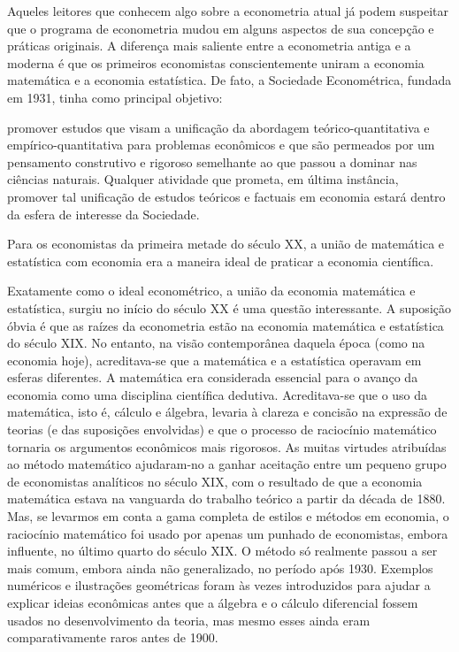 \documentclass[12pt]{article}
\begin{document}
Aqueles leitores que conhecem algo sobre a econometria atual já podem suspeitar que o programa de econometria mudou em alguns aspectos de sua concepção e práticas originais. A diferença mais saliente entre a econometria antiga e a moderna é que os primeiros economistas conscientemente uniram a economia matemática e a economia estatística. De fato, a Sociedade Econométrica, fundada em 1931, tinha como principal objetivo:

promover estudos que visam a unificação da abordagem teórico-quantitativa e empírico-quantitativa para problemas econômicos e que são permeados por um pensamento construtivo e rigoroso semelhante ao que passou a dominar nas ciências naturais. Qualquer atividade que prometa, em última instância, promover tal unificação de estudos teóricos e factuais em economia estará dentro da esfera de interesse da Sociedade.

Para os economistas da primeira metade do século XX, a união de matemática e estatística com economia era a maneira ideal de praticar a economia científica.

Exatamente como o ideal econométrico, a união da economia matemática e estatística, surgiu no início do século XX é uma questão interessante. A suposição óbvia é que as raízes da econometria estão na economia matemática e estatística do século XIX. No entanto, na visão contemporânea daquela época (como na economia hoje), acreditava-se que a matemática e a estatística operavam em esferas diferentes. A matemática era considerada essencial para o avanço da economia como uma disciplina científica dedutiva. Acreditava-se que o uso da matemática, isto é, cálculo e álgebra, levaria à clareza e concisão na expressão de teorias (e das suposições envolvidas) e que o processo de raciocínio matemático tornaria os argumentos econômicos mais rigorosos. As muitas virtudes atribuídas ao método matemático ajudaram-no a ganhar aceitação entre um pequeno grupo de economistas analíticos no século XIX, com o resultado de que a economia matemática estava na vanguarda do trabalho teórico a partir da década de 1880. Mas, se levarmos em conta a gama completa de estilos e métodos em economia, o raciocínio matemático foi usado por apenas um punhado de economistas, embora influente, no último quarto do século XIX. O método só realmente passou a ser mais comum, embora ainda não generalizado, no período após 1930. Exemplos numéricos e ilustrações geométricas foram às vezes introduzidos para ajudar a explicar ideias econômicas antes que a álgebra e o cálculo diferencial fossem usados no desenvolvimento da teoria, mas mesmo esses ainda eram comparativamente raros antes de 1900.
\end{document}
